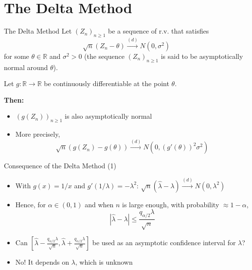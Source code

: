 \documentclass[aspectratio=169]{beamer}
\begin{document}
\section{The Delta Method}

\begin{frame}{The Delta Method}
Let $(Z_n)_{n\geq 1}$ be a sequence of r.v. that satisfies
\[\sqrt{n}(Z_n - \theta) \xrightarrow{(d)} N(0, \sigma^2)\]
for some $\theta \in \mathbb{R}$ and $\sigma^2 > 0$ (the sequence $(Z_n)_{n\geq 1}$ is said to be asymptotically normal around $\theta$).

\vspace{0.3cm}

Let $g : \mathbb{R} \to \mathbb{R}$ be continuously differentiable at the point $\theta$.

\vspace{0.3cm}

\textbf{Then:}
\begin{itemize}
    \item $(g(Z_n))_{n\geq 1}$ is also asymptotically normal
    \item More precisely,
    \[\sqrt{n}(g(Z_n) - g(\theta)) \xrightarrow{(d)} N(0, (g'(\theta))^2\sigma^2)\]
\end{itemize}
\end{frame}

\begin{frame}{Consequence of the Delta Method (1)}
\begin{itemize}
    \item With $g(x) = 1/x$ and $g'(1/\lambda) = -\lambda^2$: $\sqrt{n}(\hat{\lambda} - \lambda) \xrightarrow{(d)} N(0, \lambda^2)$

    \item Hence, for $\alpha \in (0, 1)$ and when $n$ is large enough, with probability $\approx 1 - \alpha$,
    \[|\hat{\lambda} - \lambda| \leq \frac{q_{\alpha/2}\lambda}{\sqrt{n}}\]

    \item Can $\left[\hat{\lambda} - \frac{q_{\alpha/2}\lambda}{\sqrt{n}}, \hat{\lambda} + \frac{q_{\alpha/2}\lambda}{\sqrt{n}}\right]$ be used as an asymptotic confidence interval for $\lambda$?

    \item No! It depends on $\lambda$, which is unknown
\end{itemize}
\end{frame}
\end{document}

